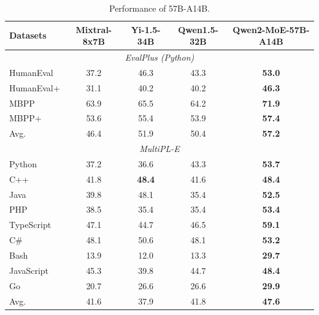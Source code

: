 \begin{table}[t]
\centering
\caption{Performance of 57B-A14B.}
\label{tab:code-57a14}
\begin{tabular}{@{}l|cccc@{}}
\toprule
\textbf{Datasets} &\textbf{Mixtral-8x7B}   & \textbf{Yi-1.5-34B} & \textbf{Qwen1.5-32B}  &\textbf{Qwen2-MoE-57B-A14B} \\
\midrule
\multicolumn{5}{c}{\textit{EvalPlus (Python)}} \\
\midrule
HumanEval & 37.2  & 46.3  & 43.3 & \textbf{53.0} \\
HumanEval+ & 31.1  & 40.2 & 40.2  & \textbf{46.3} \\
MBPP       & 63.9  & 65.5 & 64.2 & \textbf{71.9} \\
MBPP+     & 53.6  & 55.4 & 53.9 & \textbf{57.4} \\
\midrule
Avg. & 46.4 & 51.9 & 50.4 & \textbf{57.2} \\
\midrule
\multicolumn{5}{c}{\textit{MultiPL-E}} \\
\midrule
Python      & 37.2 & 36.6 & 43.3 & \textbf{53.7} \\
C++         & 41.8  & \textbf{48.4} & 41.6 & \textbf{48.4} \\
Java        & 39.8  & 48.1  & 35.4 & \textbf{52.5} \\
PHP         & 38.5 &  35.4 & 35.4 &\textbf{53.4} \\
TypeScript   & 47.1 &  44.7 & 46.5  & \textbf{59.1} \\
C\#          & 48.1  & 50.6 & 48.1  & \textbf{53.2} \\
Bash        & 13.9 & 12.0 & 13.3  & \textbf{29.7} \\
JavaScript  & 45.3  & 39.8 & 44.7 &  \textbf{48.4} \\
Go          & 20.7  & 26.6  & 26.6 & \textbf{29.9} \\
\midrule
Avg.        & 41.6  & 37.9 & 41.8 & \textbf{47.6} \\
\bottomrule
\end{tabular}
\end{table}



